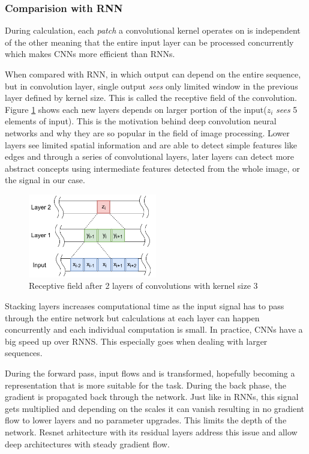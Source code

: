 \documentclass[times, utf8, diplomski, numeric, english]{fer}
\begin{document}
  
\subsubsection{Comparision with RNN}


During calculation, each \textit{patch} a convolutional kernel operates on is independent of the other meaning that the entire input layer can be processed concurrently which makes CNNs more efficient than RNNs. 

When compared with RNN, in which output can depend on the entire sequence, but in convolution layer, single output \textit{sees} only limited window in the previous layer defined by kernel size. This is called the receptive field of the convolution. 
Figure \ref{fg:receptive field} shows each new layers depends on larger portion of the input($z_i$ \textit{sees} 5 elements of input). 
This is the motivation behind deep convolution neural networks and why they are so popular in the field of image processing. Lower layers see limited spatial information and are able to detect simple features like edges and through a series of convolutional layers, later layers can detect more abstract concepts using intermediate features detected from the whole image, or the signal in our case.

\begin{figure}[!ht]
	\begin{center}
		\includegraphics[width=0.5\textwidth]{./imgs/receptive_field.png}
		\caption{Receptive field after 2 layers of convolutions with kernel size 3}
		\label{fg:receptive field}
	\end{center}
\end{figure}
Stacking layers increases computational time as the input signal has to pass through the entire network but calculations at each layer can happen concurrently and each individual computation is small.
In practice, CNNs have a big speed up over RNNS. This especially goes when dealing with larger sequences\cite{facebook}.

During the forward pass, input flows and is transformed, hopefully becoming a representation that is more suitable for the task. During the back phase, the gradient is propagated back through the network. Just like in RNNs, this signal gets multiplied and depending on the scales it can vanish resulting in no gradient flow to lower layers and no parameter upgrades. This limits the depth of the network. Resnet arhitecture\cite{resnet} with its residual layers address this issue and allow deep architectures with steady gradient flow.
\end{document}
